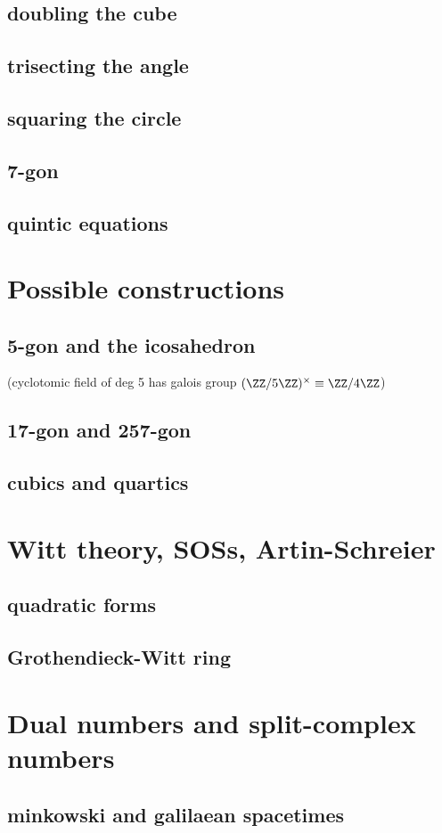 \documentclass[a4,12pt]{amsbook}
\begin{document}
\section{doubling the cube}
\section{trisecting the angle}
\section{squaring the circle}
\section{7-gon}
\section{quintic equations}
\chapter{Possible constructions}
\section{5-gon and the icosahedron}
(cyclotomic field of deg 5 has galois group $(\ZZ/5\ZZ)^\times \equiv \ZZ/4\ZZ$)
\section{17-gon and 257-gon}
\section{cubics and quartics}
\chapter{Witt theory, SOSs, Artin-Schreier}
\section{quadratic forms}
\section{Grothendieck-Witt ring}
\chapter{Dual numbers and split-complex numbers}
\section{minkowski and galilaean spacetimes}


\end{document}
